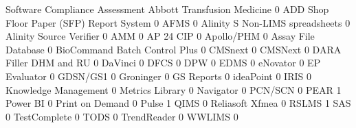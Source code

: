 \documentclass{article}
\begin{document}
\begin{Schunk}
\begin{Soutput}
                                           Software Compliance Assessment
  Abbott Transfusion Medicine                                           0
  ADD Shop Floor Paper (SFP) Report System                              0
  AFMS                                                                  0
  Alinity S Non-LIMS spreadsheets                                       0
  Alinity Source Verifier                                               0
  AMM                                                                   0
  AP 24 CIP                                                             0
  Apollo/PHM                                                            0
  Assay File Database                                                   0
  BioCommand Batch Control Plus                                         0
  CMSnext                                                               0
  CMSNext                                                               0
  DARA Filler DHM and RU                                                0
  DaVinci                                                               0
  DFCS                                                                  0
  DPW                                                                   0
  EDMS                                                                  0
  eNovator                                                              0
  EP Evaluator                                                          0
  GDSN/GS1                                                              0
  Groninger                                                             0
  GS Reports                                                            0
  ideaPoint                                                             0
  IRIS                                                                  0
  Knowledge Management                                                  0
  Metrics Library                                                       0
  Navigator                                                             0
  PCN/SCN                                                               0
  PEAR                                                                  1
  Power BI                                                              0
  Print on Demand                                                       0
  Pulse                                                                 1
  QIMS                                                                  0
  Reliasoft Xfmea                                                       0
  RSLMS                                                                 1
  SAS                                                                   0
  TestComplete                                                          0
  TODS                                                                  0
  TrendReader                                                           0
  WWLIMS                                                                0
                                          

\end{Soutput}
\end{Schunk}
\end{document}
